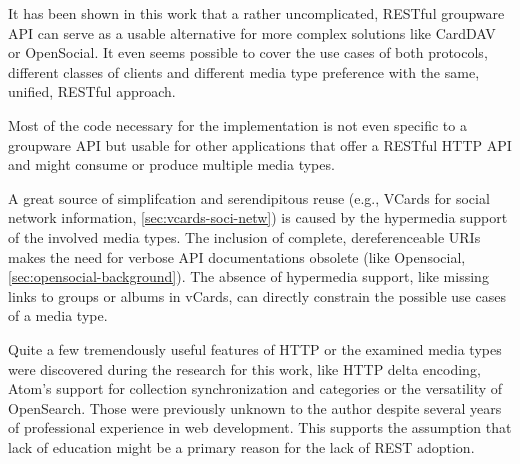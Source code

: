 \documentclass[11pt,a4paper,headsepline,twoside]{scrartcl}		%
\begin{document}



It has been shown in this work that a rather uncomplicated, RESTful groupware
API can serve as a usable alternative for more complex solutions like CardDAV or
OpenSocial. It even seems possible to cover the use cases of both protocols,
different classes of clients and different media type preference with the same,
unified, RESTful approach.

Most of the code necessary for the implementation is not even specific to a
groupware API but usable for other applications that offer a RESTful HTTP API
and might consume or produce multiple media types.

A great source of simplifcation and serendipitous reuse (e.g., VCards for social
network information, \autoref{sec:vcards-soci-netw}) is caused by the hypermedia
support of the involved media types.  The inclusion of complete, dereferenceable
URIs makes the need for verbose API documentations obsolete (like Opensocial,
\autoref{sec:opensocial-background}). The absence of hypermedia support, like
missing links to groups or albums in vCards, can directly constrain the possible
use cases of a media type.

Quite a few tremendously useful features of HTTP or the examined media types were
discovered during the research for this work, like HTTP delta encoding, Atom's
support for collection synchronization and categories or the versatility of
OpenSearch. Those were previously unknown to the author despite several years of
professional experience in web development. This supports the assumption that
lack of education might be a primary reason for the lack of REST adoption.
\end{document}
